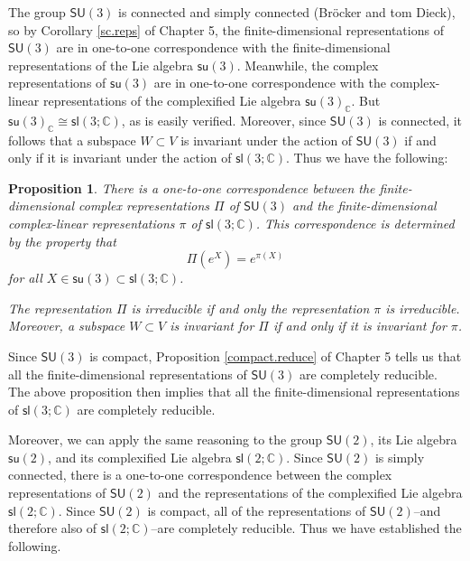 \documentclass[12pt]{amsbook}
\theoremstyle{plain}
\newtheorem{proposition}[theorem]{Proposition}
\numberwithin{equation}{chapter}
\numberwithin{theorem}{chapter}
\begin{document}
The group $\mathsf{SU}(3)$ is connected and simply connected (Br\"ocker and
tom Dieck), so by Corollary \ref{sc.reps} of Chapter 5, the finite-dimensional
representations of $\mathsf{SU}(3)$ are in one-to-one correspondence with the
finite-dimensional representations of the Lie algebra $\mathsf{su}(3)$.
Meanwhile, the complex representations of $\mathsf{su}(3)$ are in one-to-one
correspondence with the complex-linear representations of the complexified Lie
algebra $\mathsf{su}(3)_{\mathbb{C}}$. But $\mathsf{su}(3)_{\mathbb{C}}%
\cong\mathsf{sl}\left(  3;\mathbb{C}\right)  $, as is easily verified.
Moreover, since $\mathsf{SU}(3)$ is connected, it follows that a subspace
$W\subset V$ is invariant under the action of $\mathsf{SU}(3)$ if and only if
it is invariant under the action of $\mathsf{sl}\left(  3;\mathbb{C}\right)
$. Thus we have the following:

\begin{proposition}
There is a one-to-one correspondence between the finite-dimensional complex
representations $\Pi$ of $\mathsf{SU}(3)$ and the finite-dimensional
complex-linear representations $\pi$ of $\mathsf{sl}\left(  3;\mathbb{C}%
\right)  $. This correspondence is determined by the property that
\[
\Pi\left(  e^{X}\right)  =e^{\pi(X)}%
\]
for all $X\in\mathsf{su}(3)\subset\mathsf{sl}\left(  3;\mathbb{C}\right)  $.

The representation $\Pi$ is irreducible if and only the representation $\pi$
is irreducible. Moreover, a subspace $W\subset V$ is invariant for $\Pi$ if
and only if it is invariant for $\pi$.
\end{proposition}

Since $\mathsf{SU}(3)$ is compact, Proposition \ref{compact.reduce} of Chapter
5 tells us that all the finite-dimensional representations of $\mathsf{SU}(3)$
are completely reducible. The above proposition then implies that all the
finite-dimensional representations of $\mathsf{sl}\left(  3;\mathbb{C}\right)
$ are completely reducible.

Moreover, we can apply the same reasoning to the group $\mathsf{SU}(2)$, its
Lie algebra $\mathsf{su}(2)$, and its complexified Lie algebra $\mathsf{sl}%
(2;\mathbb{C})$. Since $\mathsf{SU}(2)$ is simply connected, there is a
one-to-one correspondence between the complex representations of
$\mathsf{SU}(2)$ and the representations of the complexified Lie algebra
$\mathsf{sl}(2;\mathbb{C})$. Since $\mathsf{SU}(2)$ is compact, all of the
representations of $\mathsf{SU}(2)$--and therefore also of $\mathsf{sl}%
(2;\mathbb{C})$--are completely reducible. Thus we have established the following.
\end{document}
